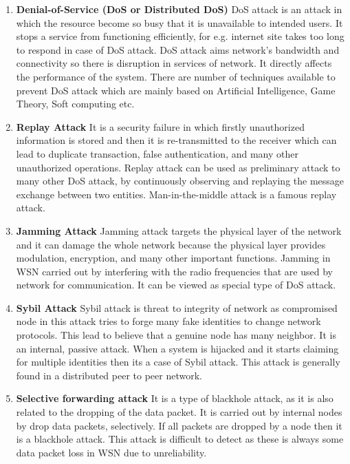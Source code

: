 \begin{enumerate}[label=\textbf{\roman*}]
    \item \textbf{Denial-of-Service (DoS or Distributed DoS) }\cite{patil2016attack} DoS attack is an attack in which the resource become so busy that it is unavailable to intended users. It stops a service from functioning efficiently, for e.g. internet site takes too long to respond in case of DoS attack. DoS attack aims  network’s bandwidth and connectivity so there is disruption in services of network. It directly affects the performance of the system. There are number of techniques available to prevent DoS attack which are mainly based on Artificial Intelligence, Game Theory, Soft computing etc.
    \item \textbf{Replay Attack }\cite{sharma2017mitigating}
    It is a security failure in which firstly unauthorized information is stored and then it is re-transmitted to the receiver which can lead to duplicate transaction, false authentication, and many other unauthorized operations. Replay attack can be used as preliminary attack to many other DoS attack, by continuously observing and replaying the message exchange between two entities. Man-in-the-middle attack is a famous replay attack.

    \item \textbf{Jamming Attack }\cite{mpitziopoulos2009survey} Jamming attack targets the physical layer of the network and it can damage the whole network because the physical layer provides modulation, encryption, and many other important functions. Jamming in WSN carried out by interfering with the radio frequencies that are used by network for communication. It can be viewed as special type of DoS attack.
    
    \item \textbf{Sybil Attack }\cite{ssu2009detecting} Sybil attack is threat to integrity of network as compromised node in this attack tries to forge many fake identities to change network protocols. This lead to believe that a genuine node has many neighbor. It is an internal, passive attack. When a system is hijacked and it starts claiming for multiple identities then its a case of Sybil attack. This attack is generally found in a distributed peer to peer network. 
    
    \item \textbf{Selective forwarding attack }\cite{bysani2011survey} It is a type of blackhole attack, as it is also related to the dropping of the data packet. It is carried out by internal nodes by drop data packets, selectively. If all packets are dropped by a node then it is a blackhole attack. This attack is difficult to detect as these is always some data packet loss in WSN due to unreliability.
    

\end{enumerate}
